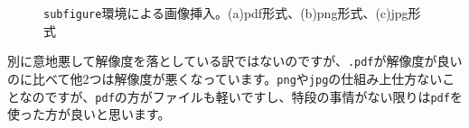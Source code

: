 \documentclass[a4paper,papersize,uplatex,dvipdfmx,10pt]{jsarticle}
\begin{document}
\begin{figure}
  \centering
  \caption[\texttt{subfigure}環境による画像挿入]{\texttt{subfigure}環境による画像挿入。(a)pdf形式、(b)png形式、(c)jpg形式}
  \label{fig:compton_sc_sb}
\end{figure}
別に意地悪して解像度を落としている訳ではないのですが、\texttt{.pdf}が解像度が良いのに比べて他2つは解像度が悪くなっています。\texttt{png}や\texttt{jpg}の仕組み上仕方ないことなのですが、\texttt{pdf}の方がファイルも軽いですし、特段の事情がない限りは\texttt{pdf}を使った方が良いと思います。
\end{document}
